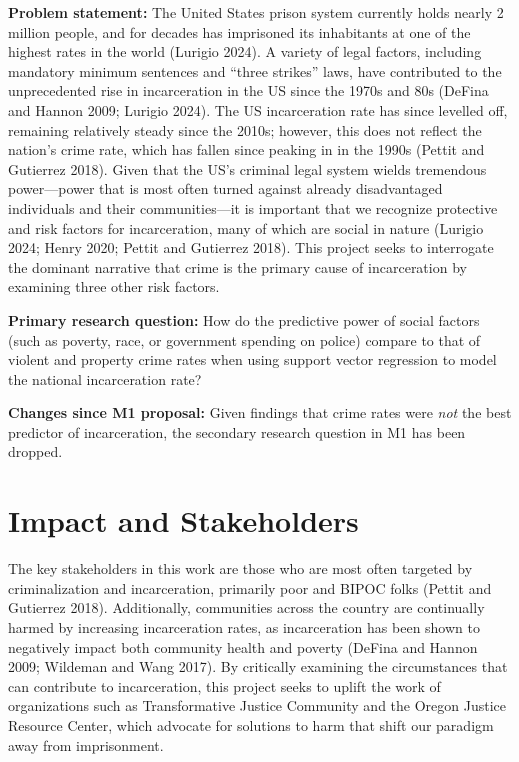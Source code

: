 \documentclass[
  letterpaper,
  DIV=11,
  numbers=noendperiod]{scrartcl}
\begin{document}
\textbf{Problem statement:} The United States prison system currently
holds nearly 2 million people, and for decades has imprisoned its
inhabitants at one of the highest rates in the world (Lurigio 2024). A
variety of legal factors, including mandatory minimum sentences and
``three strikes'' laws, have contributed to the unprecedented rise in
incarceration in the US since the 1970s and 80s (DeFina and Hannon 2009;
Lurigio 2024). The US incarceration rate has since levelled off,
remaining relatively steady since the 2010s; however, this does not
reflect the nation's crime rate, which has fallen since peaking in in
the 1990s (Pettit and Gutierrez 2018). Given that the US's criminal
legal system wields tremendous power---power that is most often turned
against already disadvantaged individuals and their communities---it is
important that we recognize protective and risk factors for
incarceration, many of which are social in nature (Lurigio 2024; Henry
2020; Pettit and Gutierrez 2018). This project seeks to interrogate the
dominant narrative that crime is the primary cause of incarceration by
examining three other risk factors.

\textbf{Primary research question:} How do the predictive power of
social factors (such as poverty, race, or government spending on police)
compare to that of violent and property crime rates when using support
vector regression to model the national incarceration rate?

\textbf{Changes since M1 proposal:} Given findings that crime rates were
\emph{not} the best predictor of incarceration, the secondary research
question in M1 has been dropped.

\section{Impact and Stakeholders}\label{impact-and-stakeholders}

The key stakeholders in this work are those who are most often targeted
by criminalization and incarceration, primarily poor and BIPOC folks
(Pettit and Gutierrez 2018). Additionally, communities across the
country are continually harmed by increasing incarceration rates, as
incarceration has been shown to negatively impact both community health
and poverty (DeFina and Hannon 2009; Wildeman and Wang 2017). By
critically examining the circumstances that can contribute to
incarceration, this project seeks to uplift the work of organizations
such as Transformative Justice Community and the Oregon Justice Resource
Center, which advocate for solutions to harm that shift our paradigm
away from imprisonment.
\end{document}
